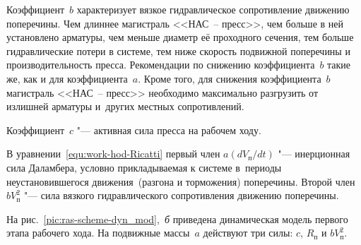 Коэффициент~$ b $ характеризует вязкое гидравлическое сопротивление движению поперечины. 
Чем длиннее магистраль <<НАС~--  пресс>>, чем больше в ней установлено арматуры, чем меньше диаметр её проходного сечения, тем больше гидравлические потери в системе, тем ниже скорость подвижной поперечины и производительность пресса. 
Рекомендации по снижению коэффициента~$ b $ такие же, как и для коэффициента~$ a $. 
Кроме того, для снижения коэффициента~$ b $  магистраль <<НАС~--  пресс>> необходимо максимально разгрузить от излишней арматуры и~других местных сопротивлений.

Коэффициент~$ c $ "---  активная сила пресса на рабочем ходу.

В уравнении~\eqref{equ:work-hod-Ricatti}   первый член $ a\left(d V_\text{п} /dt\right) $ "---  инерционная сила Даламбера, условно прикладываемая к системе в~периоды неустановившегося движения~(разгона и торможения) поперечины. 
Второй член $ b  V^{2}_\text{п} $ "---  сила вязкого гидравлического сопротивления движению поперечины.

На рис.~\ref{pic:ras-scheme-dyn_mod},~{\sl б} приведена динамическая модель первого этапа рабочего хода. 
На подвижные массы~$ a $ действуют три силы: $ c $, $ R_\text{п} $  и $ b  V^{2}_\text{п} $.

